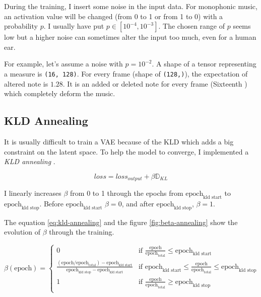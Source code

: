 \documentclass[12pt]{report}
\begin{document}
During the training, I insert some noise in the input data.
For monophonic music, an activation value will be changed (from 0 to 1 or from 1 to 0) with a probability $p$.
I usually have put $p \in [10^{-4}, 10^{-3}]$.
The chosen range of $p$ seems low but a higher noise can sometimes alter the input too much, even for a human ear.

For example, let's assume a noise with $p = 10^{-2}$.
A shape of a tensor representing a measure is \texttt{(16, 128)}.
For every frame (shape of \texttt{(128,)}), the expectation of altered note is $1.28$.
It is an added or deleted note for every frame (Sixteenth \musSixteenth) which completely deform the music.


\subsection{KLD Annealing}

It is usually difficult to train a VAE because of the KLD which adds a big constraint on the latent space.
To help the model to converge, I implemented a \textit{KLD annealing} \cite{huang_improving_2018}.

\begin{equation}
    loss = loss_{output} + \beta \mathbb{D}_{KL}
\end{equation}

I linearly increases $\beta$ from 0 to 1 through the epochs from $\text{epoch}_{\text{kld start}}$ to $\text{epoch}_{\text{kld stop}}$.
Before $\text{epoch}_{\text{kld start}}$ $\beta = 0$, and after $\text{epoch}_{\text{kld stop}}$, $\beta = 1$.

The equation \ref{eq:kld-annealing} and the figure \ref{fig:beta-annealing} show the evolution of $\beta$ through the training.

\begin{equation}
    \beta (\text{epoch}) =
    \begin{cases}
        0 & \text{if } \frac{\text{epoch}}{\text{epoch}_{\text{total}}} \leq \text{epoch}_{\text{kld start}} \\
        
        \frac{(\text{epoch} / \text{epoch}_{\text{total}}) - \text{epoch}_{\text{kld start}}}{\text{epoch}_{\text{kld stop}} - \text{epoch}_{\text{kld start}}} & \text{if } \text{epoch}_{\text{kld start}} \leq \frac{\text{epoch}}{\text{epoch}_{\text{total}}} \leq \text{epoch}_{\text{kld stop}} \\
        
        1 & \text{if } \frac{\text{epoch}}{\text{epoch}_{\text{total}}} \geq \text{epoch}_{\text{kld stop}} \\
    \end{cases}
    \label{eq:kld-annealing}
\end{equation}
\end{document}
